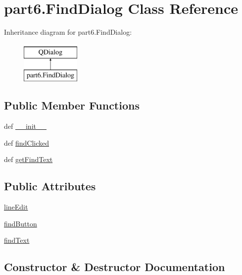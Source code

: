 \hypertarget{classpart6_1_1FindDialog}{}\section{part6.\+Find\+Dialog Class Reference}
\label{classpart6_1_1FindDialog}
Inheritance diagram for part6.\+Find\+Dialog\+:\begin{figure}[H]
\begin{center}
\leavevmode
\includegraphics[height=2.000000cm]{classpart6_1_1FindDialog}
\end{center}
\end{figure}
\subsection*{Public Member Functions}
\begin{DoxyCompactItemize}
\item 
def \hyperlink{classpart6_1_1FindDialog_a41631b3f939c288d6459dc6dd7172e88}{\+\_\+\+\_\+init\+\_\+\+\_\+}
\item 
def \hyperlink{classpart6_1_1FindDialog_ac9486ee6fa7a104cb92288c012d54028}{find\+Clicked}
\item 
def \hyperlink{classpart6_1_1FindDialog_a1cc2cc40dfaeaa5f03336a0dfccceb90}{get\+Find\+Text}
\end{DoxyCompactItemize}
\subsection*{Public Attributes}
\begin{DoxyCompactItemize}
\item 
\hyperlink{classpart6_1_1FindDialog_aadc750ff866f3c61440077338d178fef}{line\+Edit}
\item 
\hyperlink{classpart6_1_1FindDialog_adb1ed29ee33b90aca1afdc46cea360ff}{find\+Button}
\item 
\hyperlink{classpart6_1_1FindDialog_aa218912b8f376d6234fddeb772b76d6f}{find\+Text}
\end{DoxyCompactItemize}


\subsection{Constructor \& Destructor Documentation}
\hypertarget{classpart6_1_1FindDialog_a41631b3f939c288d6459dc6dd7172e88}{}
